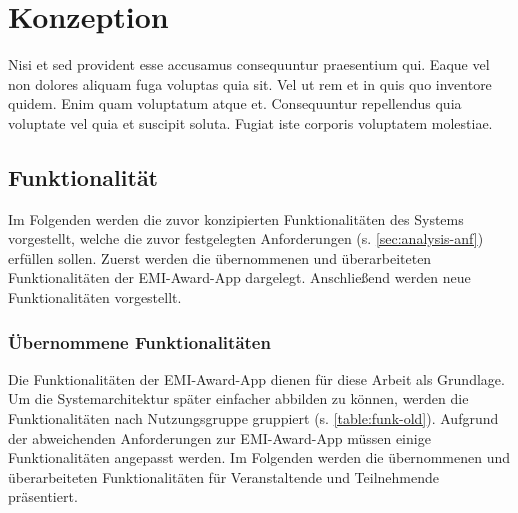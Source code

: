 \chapter{Konzeption}

Nisi et sed provident esse accusamus consequuntur praesentium qui. Eaque vel non dolores aliquam fuga voluptas quia sit. Vel ut rem et in quis quo inventore quidem. Enim quam voluptatum atque et. Consequuntur repellendus quia voluptate vel quia et suscipit soluta. Fugiat iste corporis voluptatem molestiae.

\section{Funktionalität}

Im Folgenden werden die zuvor konzipierten Funktionalitäten des Systems
vorgestellt, welche die zuvor festgelegten Anforderungen (s.
\autoref{sec:analysis-anf}) erfüllen sollen. Zuerst werden die übernommenen und
überarbeiteten Funktionalitäten der EMI-Award-App dargelegt. Anschließend werden
neue Funktionalitäten vorgestellt.

\subsection{Übernommene Funktionalitäten}

Die Funktionalitäten der EMI-Award-App dienen für diese Arbeit als Grundlage. Um
die Systemarchitektur später einfacher abbilden zu können, werden die
Funktionalitäten nach Nutzungsgruppe gruppiert (s. \autoref{table:funk-old}).
Aufgrund der abweichenden Anforderungen zur EMI-Award-App müssen einige
Funktionalitäten angepasst werden. Im Folgenden werden die übernommenen und
überarbeiteten Funktionalitäten für Veranstaltende und Teilnehmende präsentiert.

